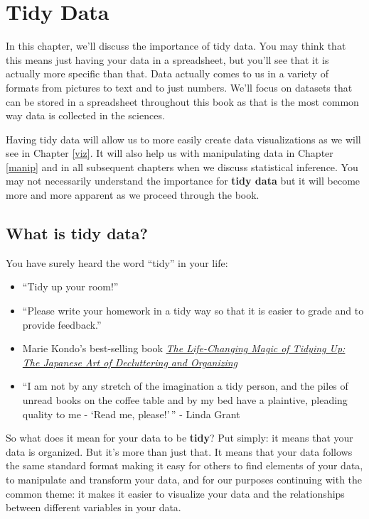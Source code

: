 \documentclass[]{tufte-book}
\providecommand{\tightlist}{%
  \setlength{\itemsep}{0pt}\setlength{\parskip}{0pt}}
\begin{document}
\chapter{Tidy Data}\label{tidy}

In this chapter, we'll discuss the importance of tidy data. You may
think that this means just having your data in a spreadsheet, but you'll
see that it is actually more specific than that. Data actually comes to
us in a variety of formats from pictures to text and to just numbers.
We'll focus on datasets that can be stored in a spreadsheet throughout
this book as that is the most common way data is collected in the
sciences.

Having tidy data will allow us to more easily create data visualizations
as we will see in Chapter \ref{viz}. It will also help us with
manipulating data in Chapter \ref{manip} and in all subsequent chapters
when we discuss statistical inference. You may not necessarily
understand the importance for \textbf{tidy data} but it will become more
and more apparent as we proceed through the book.

\section{What is tidy data?}\label{what-is-tidy-data}

You have surely heard the word ``tidy'' in your life:

\begin{itemize}
\tightlist
\item
  ``Tidy up your room!''
\item
  ``Please write your homework in a tidy way so that it is easier to
  grade and to provide feedback.''
\item
  Marie Kondo's best-selling book
  \href{https://www.amazon.com/Life-Changing-Magic-Tidying-Decluttering-Organizing/dp/1607747308/ref=sr_1_1?ie=UTF8\&qid=1469400636\&sr=8-1\&keywords=tidying+up}{\emph{The
  Life-Changing Magic of Tidying Up: The Japanese Art of Decluttering
  and Organizing}}
\item
  ``I am not by any stretch of the imagination a tidy person, and the
  piles of unread books on the coffee table and by my bed have a
  plaintive, pleading quality to me - `Read me, please!'\,'' - Linda
  Grant
\end{itemize}

So what does it mean for your data to be \textbf{tidy}? Put simply: it
means that your data is organized. But it's more than just that. It
means that your data follows the same standard format making it easy for
others to find elements of your data, to manipulate and transform your
data, and for our purposes continuing with the common theme: it makes it
easier to visualize your data and the relationships between different
variables in your data.
\end{document}
